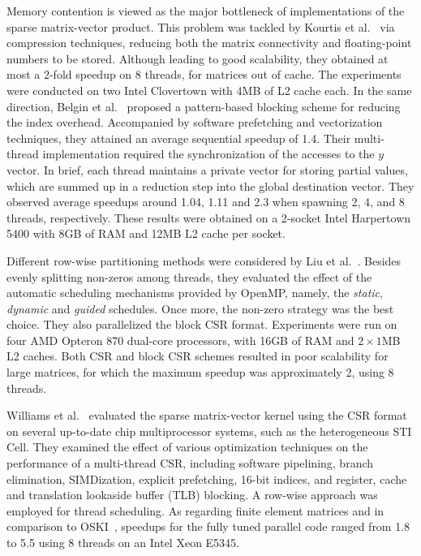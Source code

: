 \documentclass[11pt]{article}
\begin{document}
Memory contention is viewed as the major bottleneck of implementations of the
sparse matrix-vector product. This problem was tackled by Kourtis et al.~\cite{KGK08a} via
compression techniques, reducing both the matrix connectivity and
floating-point numbers to be stored.  Although leading to good scalability,
they obtained at most a 2-fold speedup on 8 threads, for matrices out of cache.
The experiments were conducted on two Intel Clovertown with 4MB of L2
cache each.  In the same direction, Belgin et al.~\cite{BBR09a} proposed a
pattern-based blocking scheme for reducing the index overhead.
Accompanied by software prefetching and vectorization techniques, they attained
an average sequential speedup of 1.4.  Their multi-thread implementation required the
synchronization of the accesses to the $y$ vector. In brief, each thread
maintains a private vector for storing partial values, which are summed up in a
reduction step into the global destination vector.  They observed average
speedups around 1.04, 1.11 and 2.3 when spawning 2, 4, and 8 threads,
respectively.  These results were obtained on a 2-socket Intel Harpertown 5400
with 8GB of RAM and 12MB L2 cache per socket.

Different row-wise partitioning methods were considered by Liu et al.~\cite{LZSQ09a}.
Besides evenly splitting non-zeros among threads, they evaluated
the effect of the automatic scheduling mechanisms provided by OpenMP, namely,
the \textit{static}, \textit{dynamic} and \textit{guided} schedules.  Once
more, the non-zero strategy was the best choice.  They also
parallelized the block CSR format.  Experiments were run on four AMD Opteron 870
dual-core processors, with 16GB of RAM and $2 \times 1$MB L2 caches.  Both
CSR and block CSR schemes resulted in poor scalability for large matrices,
for which the maximum speedup was approximately 2, using 8 threads.

Williams et al.~\cite{WOVSYD09a} evaluated the sparse matrix-vector kernel using the CSR
format on several up-to-date chip multiprocessor systems, such as the
heterogeneous STI Cell.  They examined the effect of various optimization techniques
on the performance of a multi-thread CSR, including software
pipelining, branch elimination, SIMDization, explicit prefetching, 16-bit
indices, and register, cache and translation lookaside buffer (TLB) blocking.
A row-wise approach was employed for
thread scheduling.  As regarding finite element matrices and in comparison to OSKI~\cite{VDY05a},
speedups for the fully tuned parallel code ranged
from 1.8 to 5.5 using 8 threads on an Intel Xeon E5345.
\end{document}
